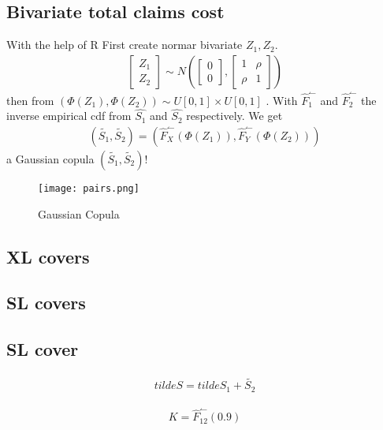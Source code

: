 \documentclass[11pt]{article}
\begin{document}
\subsection*{Bivariate total claims cost}
With the help of R 
First create normar bivariate $Z_1,Z_2$.
\begin{align} \label{eq:bi1}
	 \begin{bmatrix} Z_1 \\ Z_2\end{bmatrix} \sim N\left(\begin{bmatrix} 0 \\ 0\end{bmatrix},\begin{bmatrix} 1&\rho \\ \rho&1\end{bmatrix}\right)
\end{align}
then from   $\left(\Phi(Z_1),\Phi(Z_2)\right) \sim  U[0,1] \times U[0,1]$ .
With $\hat{F}_1^\leftharpoonup$ and $\hat{F}_2^\leftharpoonup$ the inverse empirical cdf from $\hat{S_1}$ and $\hat{S_2}$ respectively.
We get
\begin{align} \label{eq:bi3}
	  \left(\tilde{S_1},\tilde{S_2}\right) = \left(\hat{F}_X^\leftharpoonup(\Phi(Z_1)),\hat{F}_Y^\leftharpoonup(\Phi(Z_2))\right) 
\end{align}
a Gaussian copula $ \left(\tilde{S_1},\tilde{S_2}\right)$!

 \begin{figure}[H]
 \center
  \texttt{[image: pairs.png]}
  \caption{Gaussian Copula}
  \label{fig:samplefig5}
\end{figure}

\subsection*{XL covers}

\subsection*{SL covers}

\subsection*{SL cover}

\begin{align*} 
	tilde{S}= tilde{S_1} + \tilde{S_2}
\end{align*}

\begin{align*} 
	K = \hat{F}_{12}^\leftharpoonup(0.9)
\end{align*}
\end{document}
